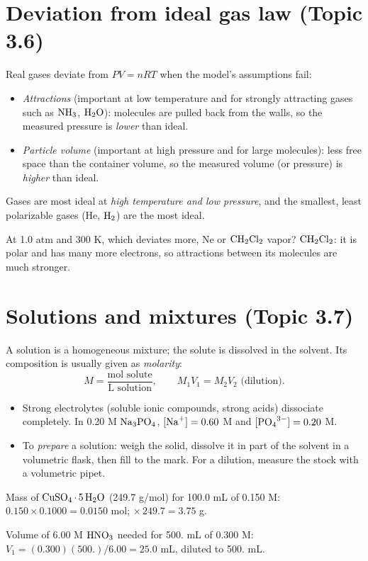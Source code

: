 \documentclass[11pt]{article}
\begin{document}
\section{Deviation from ideal gas law (Topic 3.6)}\label{t:3.6}
Real gases deviate from $PV = nRT$ when the model's assumptions fail:
\begin{itemize}
\item \emph{Attractions} (important at low temperature and for strongly attracting gases such as $\ce{NH3}$, $\ce{H2O}$): molecules are pulled back from the walls, so the measured pressure is \emph{lower} than ideal.
\item \emph{Particle volume} (important at high pressure and for large molecules): less free space than the container volume, so the measured volume (or pressure) is \emph{higher} than ideal.
\end{itemize}
Gases are most ideal at \emph{high temperature and low pressure}, and the smallest, least polarizable gases (He, $\ce{H2}$) are the most ideal.

 At 1.0 atm and 300 K, which deviates more, Ne or $\ce{CH2Cl2}$ vapor? $\ce{CH2Cl2}$: it is polar and has many more electrons, so attractions between its molecules are much stronger.

\section{Solutions and mixtures (Topic 3.7)}\label{t:3.7}
A solution is a homogeneous mixture; the solute is dissolved in the solvent. Its composition is usually given as \emph{molarity}:
\[ M = \frac{\text{mol solute}}{\text{L solution}}, \qquad M_1V_1 = M_2V_2 \text{ (dilution).} \]
\begin{itemize}
\item Strong electrolytes (soluble ionic compounds, strong acids) dissociate completely. In 0.20 M $\ce{Na3PO4}$, $[\ce{Na+}] = 0.60$ M and $[\ce{PO4^3-}] = 0.20$ M.
\item To \emph{prepare} a solution: weigh the solid, dissolve it in part of the solvent in a volumetric flask, then fill to the mark. For a dilution, measure the stock with a volumetric pipet.
\end{itemize}
 Mass of $\ce{CuSO4*5H2O}$ (249.7 g/mol) for 100.0 mL of 0.150 M: $0.150 \times 0.1000 = 0.0150$ mol; $\times\,249.7 = 3.75$ g.

 Volume of 6.00 M $\ce{HNO3}$ needed for 500. mL of 0.300 M: $V_1 = (0.300)(500.)/6.00 = 25.0$ mL, diluted to 500. mL.
\end{document}
